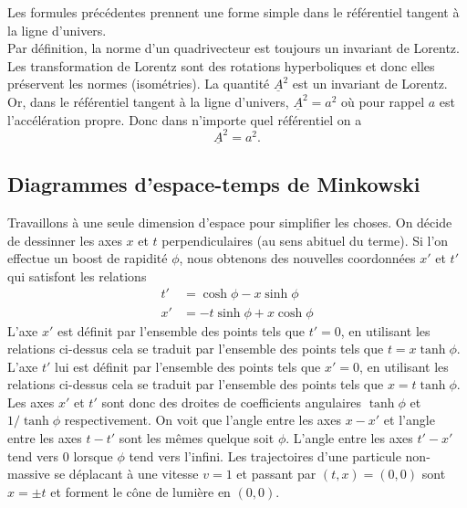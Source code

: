 \documentclass[a4paper,11pt]{report}
\begin{document}
            Les formules précédentes prennent une forme simple dans le référentiel tangent à la ligne d'univers.\\
            
            Par définition, la norme d'un quadrivecteur est toujours un invariant de Lorentz. Les transformation de Lorentz sont des rotations hyperboliques et donc elles préservent les normes (isométries). La quantité $\underline{A}^2$ est un invariant de Lorentz. Or, dans le référentiel tangent à la ligne d'univers, $\underline{A}^2 = a^2$ où pour rappel $a$ est l'accélération propre. Donc dans n'importe quel référentiel on a
            \begin{equation}
                \underline{A}^2 = a^2.
            \end{equation}
        
        \subsection{Diagrammes d'espace-temps de Minkowski}
        
            Travaillons à une seule dimension d'espace pour simplifier les choses. On décide de dessinner les axes $x$ et $t$ perpendiculaires (au sens abituel du terme). Si l'on effectue un boost de rapidité $\phi$, nous obtenons des nouvelles coordonnées $x'$ et $t'$ qui satisfont les relations
            \begin{align}
            	t' &= \cosh\phi-x\sinh\phi\\
            	x' &= -t\sinh\phi + x\cosh\phi
            \end{align}
			L'axe $x'$ est définit par l'ensemble des points tels que $t'=0$, en utilisant les relations ci-dessus cela se traduit par l'ensemble des points tels que $t=x\tanh\phi$. L'axe $t'$ lui est définit par l'ensemble des points tels que $x'=0$, en utilisant les relations ci-dessus cela se traduit par l'ensemble des points tels que $x=t\tanh\phi$. Les axes $x'$ et $t'$ sont donc des droites de coefficients angulaires $\tanh\phi$ et $1/\tanh\phi$ respectivement. On voit que l'angle entre les axes $x-x'$ et l'angle entre les axes $t-t'$ sont les mêmes quelque soit $\phi$. L'angle entre les axes $t'-x'$ tend vers $0$ lorsque $\phi$ tend vers l'infini. Les trajectoires d'une particule non-massive se déplacant à une vitesse $v=1$ et passant par $(t,x)=(0,0)$ sont $x=\pm t$ et forment le cône de lumière en $(0,0)$.\\       
            
\end{document}
